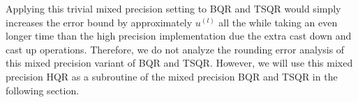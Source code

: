Applying this trivial mixed precision setting to BQR and TSQR would simply increases the error bound by approximately $u^{(l)}$ all the while taking an even longer time than the high precision implementation due the extra cast down and cast up operations.
Therefore, we do not analyze the rounding error analysis of this mixed precision variant of BQR and TSQR.
However, we will use this mixed precision HQR as a subroutine of the mixed precision BQR and TSQR in the following section. 
